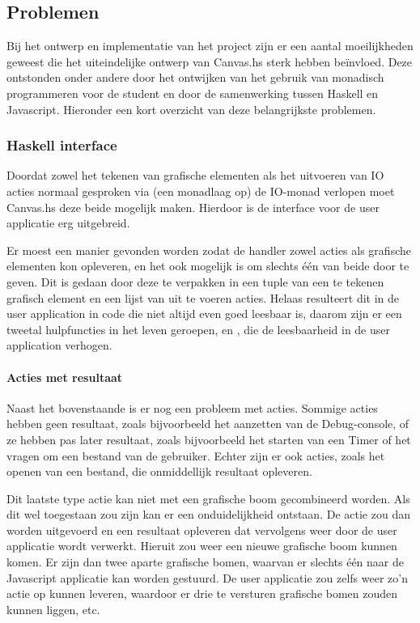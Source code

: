\subsection{Problemen}

Bij het ontwerp en implementatie van het project zijn er een aantal moeilijkheden geweest die het uiteindelijke ontwerp van Canvas.hs sterk hebben beïnvloed. Deze ontstonden onder andere door het ontwijken van het gebruik van monadisch programmeren voor de student en door de samenwerking tussen Haskell en Javascript. Hieronder een kort overzicht van deze belangrijkste problemen.

\subsubsection{Haskell interface}
Doordat zowel het tekenen van grafische elementen als het uitvoeren van IO acties normaal gesproken via (een monadlaag op) de IO-monad verlopen moet Canvas.hs deze beide mogelijk maken. Hierdoor is de interface voor de user applicatie erg uitgebreid. 

Er moest een manier gevonden worden zodat de handler zowel acties als grafische elementen kon opleveren, en het ook mogelijk is om slechts één van beide door te geven. Dit is gedaan door deze te verpakken in een tuple van een te tekenen grafisch element en een lijst van uit te voeren acties. Helaas resulteert dit in de user application in code die niet altijd even goed leesbaar is, daarom zijn er een tweetal hulpfuncties in het leven geroepen,  en , die de leesbaarheid in de user application verhogen.

\paragraph{Acties met resultaat}
Naast het bovenstaande is er nog een probleem met acties. Sommige acties hebben geen resultaat, zoals bijvoorbeeld het aanzetten van de Debug-console, of ze hebben pas later resultaat, zoals bijvoorbeeld het starten van een Timer of het vragen om een bestand van de gebruiker. Echter zijn er ook acties, zoals het openen van een bestand, die onmiddellijk resultaat opleveren. 

Dit laatste type actie kan niet met een grafische boom gecombineerd worden. Als dit wel toegestaan zou zijn kan er een onduidelijkheid ontstaan. De actie zou dan worden uitgevoerd en een resultaat opleveren dat vervolgens weer door de user applicatie wordt verwerkt. Hieruit zou weer een nieuwe grafische boom kunnen komen. Er zijn dan twee aparte grafische bomen, waarvan er slechts één naar de Javascript applicatie kan worden gestuurd. De user applicatie zou zelfs weer zo'n actie op kunnen leveren, waardoor er drie te versturen grafische bomen zouden kunnen liggen, etc. 

